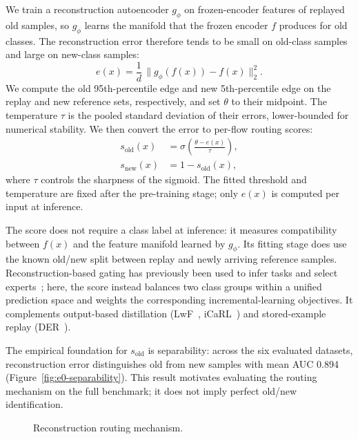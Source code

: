 We train a reconstruction autoencoder $g_\phi$ on frozen-encoder features of replayed old samples, so $g_\phi$ learns the manifold that the frozen encoder $f$ produces for old classes. The reconstruction error therefore tends to be small on old-class samples and large on new-class samples:
\begin{equation}\label{eq:recon}
e(x) = \frac{1}{d}\,\| g_\phi(f(x)) - f(x) \|_2^2.
\end{equation}
We compute the old 95th-percentile edge and new 5th-percentile edge on the replay and new reference sets, respectively, and set $\theta$ to their midpoint. The temperature $\tau$ is the pooled standard deviation of their errors, lower-bounded for numerical stability. We then convert the error to per-flow routing scores:
\begin{align}
s_{\mathrm{old}}(x) &= \sigma\!\left(\frac{\theta - e(x)}{\tau}\right),\label{eq:score-old}\\
s_{\mathrm{new}}(x) &= 1 - s_{\mathrm{old}}(x),\label{eq:score-new}
\end{align}
where $\tau$ controls the sharpness of the sigmoid. The fitted threshold and temperature are fixed after the pre-training stage; only $e(x)$ is computed per input at inference.

The score does not require a class label at inference: it measures compatibility between $f(x)$ and the feature manifold learned by $g_\phi$. Its fitting stage does use the known old/new split between replay and newly arriving reference samples. Reconstruction-based gating has previously been used to infer tasks and select experts~\cite{aljundi2017expertgate}; here, the score instead balances two class groups within a unified prediction space and weights the corresponding incremental-learning objectives. It complements output-based distillation (LwF~\cite{li2017lwf}, iCaRL~\cite{rebuffi2017icarl}) and stored-example replay (DER~\cite{yan2021der}).

The empirical foundation for $s_{\mathrm{old}}$ is separability: across the six evaluated datasets, reconstruction error distinguishes old from new samples with mean AUC 0.894 (Figure~\ref{fig:e0-separability}). This result motivates evaluating the routing mechanism on the full benchmark; it does not imply perfect old/new identification.

\begin{figure}[t]
\centering

\caption{Reconstruction routing mechanism.}
\label{fig:recon-routing}
\end{figure}

